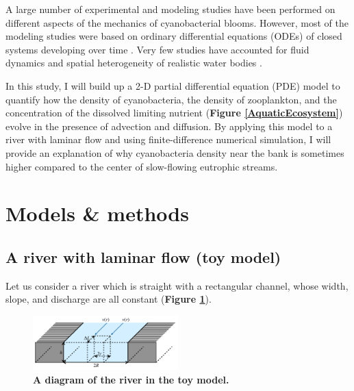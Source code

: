 \documentclass{article}
\begin{document}
A large number of experimental and modeling studies have been performed on different aspects of the mechanics of cyanobacterial blooms. However, most of the modeling studies were based on ordinary differential equations (ODEs) of closed systems developing over time \cite{SteeleHenderson, DumitranVuta}. Very few studies have accounted for fluid dynamics and spatial heterogeneity of realistic water bodies \cite{2D-B, ZhaoTianWei}.

In this study, I will build up a 2-D partial differential equation (PDE) model to quantify how the density of cyanobacteria, the density of zooplankton, and the concentration of the dissolved limiting nutrient (\textbf{Figure \ref{AquaticEcosystem}}) evolve in the presence of advection and diffusion. By applying this model to a river with laminar flow and using finite-difference numerical simulation, I will provide an explanation of why cyanobacteria density near the bank is sometimes higher compared to the center of slow-flowing eutrophic streams.

\section*{Models \& methods}
\subsection*{A river with laminar flow (toy model)}
Let us consider a river which is straight with a rectangular channel, whose width, slope, and discharge are all constant (\textbf{Figure \ref{ToyRiverVelocityProfile}}).

\begin{figure}[h]
    \centering
    \captionsetup{justification=centering}
    \includegraphics[width=0.5\textwidth]{ToyRiverDiagram.pdf}
    \caption{\textbf{A diagram of the river in the toy model.}}
    \label{ToyRiverVelocityProfile}
\end{figure}
\end{document}
